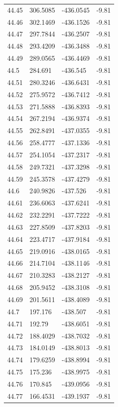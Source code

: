 \begin{table}[H]
\begin{tabular}{llll}
44.45 & 306.5085 & -436.0545 & -9.81 \\
44.46 & 302.1469 & -436.1526 & -9.81 \\
44.47 & 297.7844 & -436.2507 & -9.81 \\
44.48 & 293.4209 & -436.3488 & -9.81 \\
44.49 & 289.0565 & -436.4469 & -9.81 \\
44.5 & 284.691 & -436.545 & -9.81 \\
44.51 & 280.3246 & -436.6431 & -9.81 \\
44.52 & 275.9572 & -436.7412 & -9.81 \\
44.53 & 271.5888 & -436.8393 & -9.81 \\
44.54 & 267.2194 & -436.9374 & -9.81 \\
44.55 & 262.8491 & -437.0355 & -9.81 \\
44.56 & 258.4777 & -437.1336 & -9.81 \\
44.57 & 254.1054 & -437.2317 & -9.81 \\
44.58 & 249.7321 & -437.3298 & -9.81 \\
44.59 & 245.3578 & -437.4279 & -9.81 \\
44.6 & 240.9826 & -437.526 & -9.81 \\
44.61 & 236.6063 & -437.6241 & -9.81 \\
44.62 & 232.2291 & -437.7222 & -9.81 \\
44.63 & 227.8509 & -437.8203 & -9.81 \\
44.64 & 223.4717 & -437.9184 & -9.81 \\
44.65 & 219.0916 & -438.0165 & -9.81 \\
44.66 & 214.7104 & -438.1146 & -9.81 \\
44.67 & 210.3283 & -438.2127 & -9.81 \\
44.68 & 205.9452 & -438.3108 & -9.81 \\
44.69 & 201.5611 & -438.4089 & -9.81 \\
44.7 & 197.176 & -438.507 & -9.81 \\
44.71 & 192.79 & -438.6051 & -9.81 \\
44.72 & 188.4029 & -438.7032 & -9.81 \\
44.73 & 184.0149 & -438.8013 & -9.81 \\
44.74 & 179.6259 & -438.8994 & -9.81 \\
44.75 & 175.236 & -438.9975 & -9.81 \\
44.76 & 170.845 & -439.0956 & -9.81 \\
44.77 & 166.4531 & -439.1937 & -9.81 \\

\end{tabular}
\end{table}
